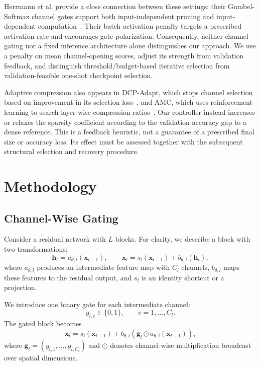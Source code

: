 \documentclass[sigplan,screen]{acmart}
\begin{document}
Herrmann et al. provide a close connection between these settings: their
Gumbel-Softmax channel gates support both input-independent pruning and
input-dependent computation~\cite{herrmann2020channel}. Their batch
activation penalty targets a prescribed activation rate and encourages
gate polarization. Consequently, neither channel gating nor a fixed
inference architecture alone distinguishes our approach. We use a
penalty on mean channel-opening scores, adjust its strength from
validation feedback, and distinguish threshold/budget-based iterative
selection from validation-feasible one-shot checkpoint selection.

Adaptive compression also appears in DCP-Adapt, which stops channel
selection based on improvement in its selection
loss~\cite{zhuang2018discrimination}, and AMC, which uses reinforcement
learning to search layer-wise compression ratios~\cite{he2018amc}.
Our controller instead increases or relaxes the sparsity coefficient
according to the validation accuracy gap to a dense reference. This is
a feedback heuristic, not a guarantee of a prescribed final size or
accuracy loss. Its effect must be assessed together with the subsequent
structural selection and recovery procedure.

\section{Methodology}

\subsection{Channel-Wise Gating}

Consider a residual network with $L$ blocks. For clarity,
we describe a block with two transformations:
\begin{equation}
\mathbf{h}_l = a_{\theta,l}(\mathbf{x}_{l-1}),
\qquad
\mathbf{x}_l
=
s_l(\mathbf{x}_{l-1})
+
b_{\theta,l}(\mathbf{h}_l),
\end{equation}
where $a_{\theta,l}$ produces an intermediate feature map
with $C_l$ channels, $b_{\theta,l}$ maps these features to
the residual output, and $s_l$ is an identity shortcut or
a projection.

We introduce one binary gate for each intermediate channel:
\begin{equation}
g_{l,c}\in\{0,1\},
\qquad c=1,\ldots,C_l.
\end{equation}
The gated block becomes
\begin{equation}
\boxed{
\mathbf{x}_l
=
s_l(\mathbf{x}_{l-1})
+
b_{\theta,l}
\left(
\mathbf{g}_l\odot
a_{\theta,l}(\mathbf{x}_{l-1})
\right),
}
\end{equation}
where $\mathbf{g}_l=(g_{l,1},\ldots,g_{l,C_l})$ and
$\odot$ denotes channel-wise multiplication broadcast over
spatial dimensions.
\end{document}
